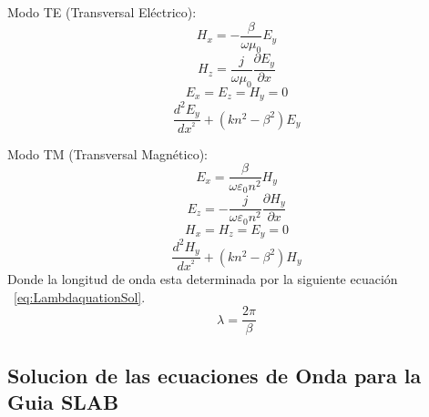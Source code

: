 \documentclass[letterpaper, 10 pt, conference]{ieeeconf}  %
\begin{document}
Modo TE (Transversal El\'ectrico):
\begin{equation}
\label{eq:ModeET2Equation}
{
{H_x} =  - \frac{\beta }{{\omega {\mu _0}}}{E_y}
}
\end{equation}
\begin{equation}
\label{eq:ModeET3Equation}
{
{H_z} = \frac{j}{{\omega {\mu _0}}}\frac{{\partial {E_y}}}{{\partial x}}
}
\end{equation}
\begin{equation}
\label{eq:ModeET4Equation}
{
{E_x} = {E_z} = {H_y} = 0
}
\end{equation}
\begin{equation}
\label{eq:ModeET1Equation}
{
\frac{{{d^2}{E_y}}}{{d{x^{^2}}}} + (k{n^2} - {\beta ^2}){E_y}
}
\end{equation}

Modo TM (Transversal Magn\'etico):
\begin{equation}
\label{eq:ModeMT2Equation}
{
{E_x} = \frac{\beta }{{\omega {\varepsilon _0}{n^2}}}{H_y}
}
\end{equation}
\begin{equation}
\label{eq:ModeMT3Equation}
{
{E_z} =  - \frac{j}{{\omega {\varepsilon _0}{n^2}}}\frac{{\partial {H_y}}}{{\partial x}}
}
\end{equation}
\begin{equation}
\label{eq:ModeMT4Equation}
{
{H_x} = {H_z} = {E_y} = 0
}
\end{equation}
\begin{equation}
\label{eq:ModeMT1Equation}
{
\frac{{{d^2}{H_y}}}{{d{x^{^2}}}} + (k{n^2} - {\beta ^2}){H_y}
}
\end{equation}
Donde la longitud de onda esta determinada por la siguiente ecuaci\'on ~\eqref{eq:LambdaquationSol}.
\begin{equation}
\label{eq:LambdaquationSol}
\lambda  = \frac{{2\pi }}{\beta }
\end{equation}
\subsection{Solucion de las ecuaciones de Onda para la Guia SLAB}
\end{document}
